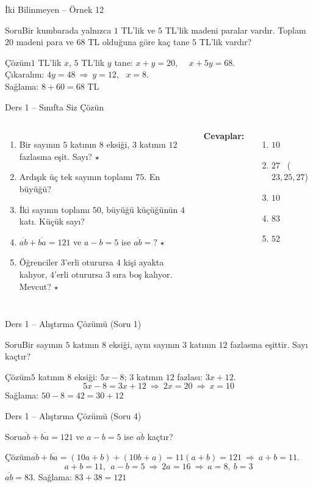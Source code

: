 \documentclass[aspectratio=169,11pt]{beamer}
\newcommand{\soru}[3]{%
\begin{frame}{#1}
  \begin{block}{Soru}\large #2\end{block}
  \pause
  \begin{exampleblock}{Çözüm}\large #3\end{exampleblock}
\end{frame}}
\newcommand{\ab}[1]{\overline{#1}}
\begin{document}
\soru{İki Bilinmeyen -- Örnek 12}
{Bir kumbarada yalnızca \(1\) TL'lik ve \(5\) TL'lik madeni paralar vardır. Toplam \(20\) madeni para ve \(68\) TL olduğuna göre kaç tane \(5\) TL'lik vardır?}
{\(1\) TL'lik \(x\), \(5\) TL'lik \(y\) tane: \quad \(x+y=20\), \ \ \(x+5y=68\).\\[3pt]
Çıkaralım: \(4y=48\ \Rightarrow\ y=12\), \ \(x=8\).\\[3pt]
Sağlama: \(8+60=68\) TL \checkmark}

\begin{frame}{Ders 1 -- Sınıfta Siz Çözün}
\begin{columns}[t]
\begin{enumerate}
\item Bir sayının \(5\) katının \(8\) eksiği, \(3\) katının \(12\) fazlasına eşit. Sayı? \(\star\)
\item Ardışık üç tek sayının toplamı \(75\). En büyüğü?
\item İki sayının toplamı \(50\), büyüğü küçüğünün \(4\) katı. Küçük sayı?
\item \(\ab{ab}+\ab{ba}=121\) ve \(a-b=5\) ise \(\ab{ab}=?\) \(\star\)
\item Öğrenciler \(3\)'erli oturursa \(4\) kişi ayakta kalıyor, \(4\)'erli oturursa \(3\) sıra boş kalıyor. Mevcut? \(\star\)
\end{enumerate}
\pause
\textbf{Cevaplar:}
\begin{enumerate}
\item \(10\)
\item \(27\) \ (\(23,25,27\))
\item \(10\)
\item \(83\)
\item \(52\)
\end{enumerate}
\end{columns}
\vspace{4pt}{\footnotesize \(\star\) işaretli soruların adım adım çözümü sonraki slaytlardadır.}
\end{frame}

\soru{Ders 1 -- Alıştırma Çözümü (Soru 1)}
{Bir sayının \(5\) katının \(8\) eksiği, aynı sayının \(3\) katının \(12\) fazlasına eşittir. Sayı kaçtır?}
{\(5\) katının \(8\) eksiği: \(5x-8\); \quad \(3\) katının \(12\) fazlası: \(3x+12\).
\[5x-8=3x+12\ \Rightarrow\ 2x=20\ \Rightarrow\ x=10\]
Sağlama: \(50-8=42=30+12\) \checkmark}

\soru{Ders 1 -- Alıştırma Çözümü (Soru 4)}
{\(\ab{ab}+\ab{ba}=121\) ve \(a-b=5\) ise \(\ab{ab}\) kaçtır?}
{\(\ab{ab}+\ab{ba}=(10a+b)+(10b+a)=11(a+b)=121\ \Rightarrow\ a+b=11\).
\[a+b=11,\ \ a-b=5\ \Rightarrow\ 2a=16\ \Rightarrow\ a=8,\ b=3\]
\(\ab{ab}=83\). \quad Sağlama: \(83+38=121\) \checkmark}
\end{document}
